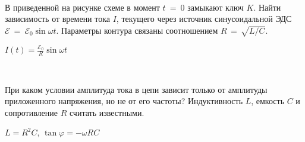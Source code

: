 \begin{ex}
\hspace{0pt} \\
\begin{minipage}{.65\textwidth}
В приведенной на рисунке схеме в момент $t$~=~0 замыкают ключ $K$. Найти зависимость от времени тока $I$, текущего через источник синусоидальной ЭДС $\mathcal{E}~=~\mathcal{E}_0 \sin \omega t$.
Параметры контура связаны соотношением $R\,=\,\sqrt{L/C}$.
\end{minipage}
\begin{minipage}{.35\textwidth}
\centering

\end{minipage}
\begin{ans}
$I(t) = \frac{\mathcal{E}_0}{R} \sin \omega t$
\end{ans}
\end{ex}

\begin{samepage}
\begin{ex}
\hspace{0pt} \\
\begin{minipage}{.65\textwidth}
При каком условии амплитуда тока в цепи зависит только от амплитуды приложенного напряжения, но не от его частоты? Индуктивность $L$, емкость $C$ и сопротивление $R$ считать известными.
\end{minipage}
\begin{minipage}{.35\textwidth}
\centering

\end{minipage}
\begin{ans}
$L=R^2C$, $\tan \varphi = -\omega RC$
\end{ans}
\end{ex}
\end{samepage}